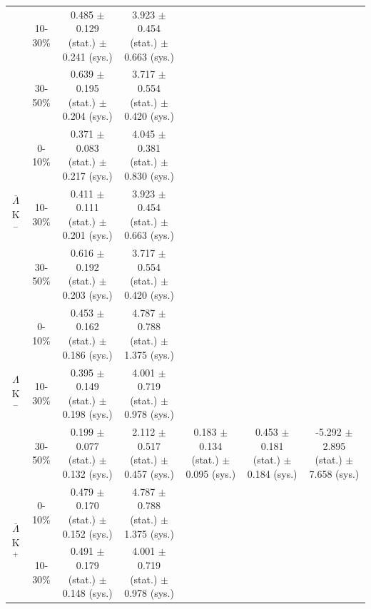 \documentclass[../AnalysisNoteJBuxton.tex]{subfiles}
\begin{document}
\begin{landscape}
\begin{table}[htbp]
{\begin{tabular}{|c|c|c|c|c|c|c|}
   & 10-30\% & 0.485 $\pm$ 0.129 (stat.) $\pm$ 0.241 (sys.)  %
             & 3.923 $\pm$ 0.454 (stat.) $\pm$ 0.663 (sys.)  %
             & & & \\
             
   & 30-50\% & 0.639 $\pm$ 0.195 (stat.) $\pm$ 0.204 (sys.)  %
             & 3.717 $\pm$ 0.554 (stat.) $\pm$ 0.420 (sys.)  %
             & & & \\
  \cline{1-4}  
  \multirow{3}{*}{$\bar{\Lambda}$K$^{-}$}  
   &  0-10\% & 0.371 $\pm$ 0.083 (stat.) $\pm$ 0.217 (sys.)  %
             & 4.045 $\pm$ 0.381 (stat.) $\pm$ 0.830 (sys.)  %
             & & & \\
             
   & 10-30\% & 0.411 $\pm$ 0.111 (stat.) $\pm$ 0.201 (sys.)  %
             & 3.923 $\pm$ 0.454 (stat.) $\pm$ 0.663 (sys.)  %
             & & & \\
             
   & 30-50\% & 0.616 $\pm$ 0.192 (stat.) $\pm$ 0.203 (sys.)  %
             & 3.717 $\pm$ 0.554 (stat.) $\pm$ 0.420 (sys.)  %
             & & & \\
  \hline
  \hline  
  \multirow{3}{*}{$\Lambda$K$^{-}$}  
   &  0-10\% & 0.453 $\pm$ 0.162 (stat.) $\pm$ 0.186 (sys.)  %
             & 4.787 $\pm$ 0.788 (stat.) $\pm$ 1.375 (sys.)  %
             & \multirow{6}{*}{0.183 $\pm$ 0.134 (stat.) $\pm$ 0.095 (sys.)}  %
             & \multirow{6}{*}{0.453 $\pm$ 0.181 (stat.) $\pm$ 0.184 (sys.)}  %
             & \multirow{6}{*}{-5.292 $\pm$ 2.895 (stat.) $\pm$ 7.658 (sys.)} \\ %
             
   & 10-30\% & 0.395 $\pm$ 0.149 (stat.) $\pm$ 0.198 (sys.)  %
             & 4.001 $\pm$ 0.719 (stat.) $\pm$ 0.978 (sys.)  %
             & & & \\
             
   & 30-50\% & 0.199 $\pm$ 0.077 (stat.) $\pm$ 0.132 (sys.)  %
             & 2.112 $\pm$ 0.517 (stat.) $\pm$ 0.457 (sys.)  %
             & & & \\
  \cline{1-4}  
  \multirow{3}{*}{$\bar{\Lambda}$K$^{+}$}  
   &  0-10\% & 0.479 $\pm$ 0.170 (stat.) $\pm$ 0.152 (sys.)  %
             & 4.787 $\pm$ 0.788 (stat.) $\pm$ 1.375 (sys.)  %
             & & & \\
             
   & 10-30\% & 0.491 $\pm$ 0.179 (stat.) $\pm$ 0.148 (sys.)  %
             & 4.001 $\pm$ 0.719 (stat.) $\pm$ 0.978 (sys.)  %
             & & & \\
             

\end{tabular}}
\end{table}
\end{landscape}
\end{document}
